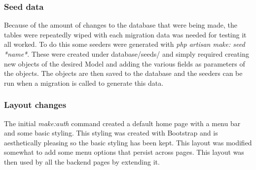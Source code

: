 \subsubsection{Seed data}
Because of the amount of changes to the database that were being made, the tables were repeatedly wiped with each migration data was needed for testing it all worked. To do this some seeders were generated with \textit{php artisan make: seed *name*}. These were created under database/seeds/ and simply required creating new objects of the desired Model and adding the various fields as parameters of the objects. The objects are then saved to the database and the seeders can be run when a migration is called to generate this data.
\subsubsection{Layout changes}
The initial \textit{make:auth} command created a default home page with a menu bar and some basic styling. This styling was created with Bootstrap\cite{bootstrap} and is aesthetically pleasing so the basic styling has been kept. This layout was modified somewhat to add some menu options that persist across pages. This layout 
was then used by all the backend pages by extending it.
\newpage
